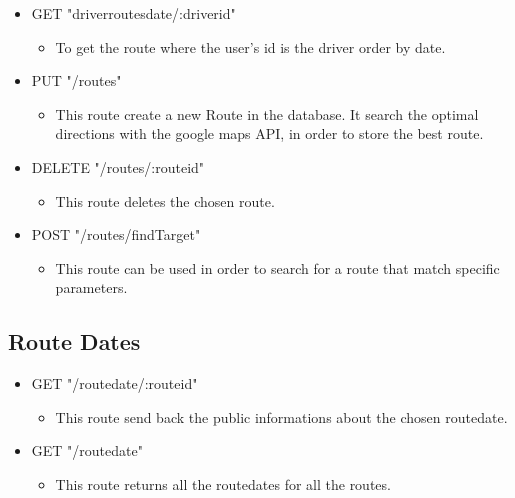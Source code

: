 \begin{itemize}
	\item GET "driverroutesdate/:driverid"
	\begin{itemize}
		\item To get the route where the user's id is the driver order by date.
	\end{itemize}
\end{itemize}

\begin{itemize}
	\item PUT "/routes"
	\begin{itemize}
		\item This route create a new Route in the database. It search the optimal directions with the google maps API, in order to store the best route.
	\end{itemize}
\end{itemize}

\begin{itemize}
	\item DELETE "/routes/:routeid"
	\begin{itemize}
		\item This route deletes the chosen route.
	\end{itemize}
\end{itemize}

\begin{itemize}
	\item POST "/routes/findTarget"
	\begin{itemize}
		\item 	This route can be used in order to search for a route that match specific parameters.
	\end{itemize}
\end{itemize}

\subsection{Route Dates}
\begin{itemize}
	\item GET "/routedate/:routeid"
	\begin{itemize}
		\item This route send back the public informations about the chosen routedate.
	\end{itemize}
\end{itemize}

\begin{itemize}
	\item GET "/routedate"
	\begin{itemize}
		\item This route returns all the routedates for all the routes.
	\end{itemize}
\end{itemize}

